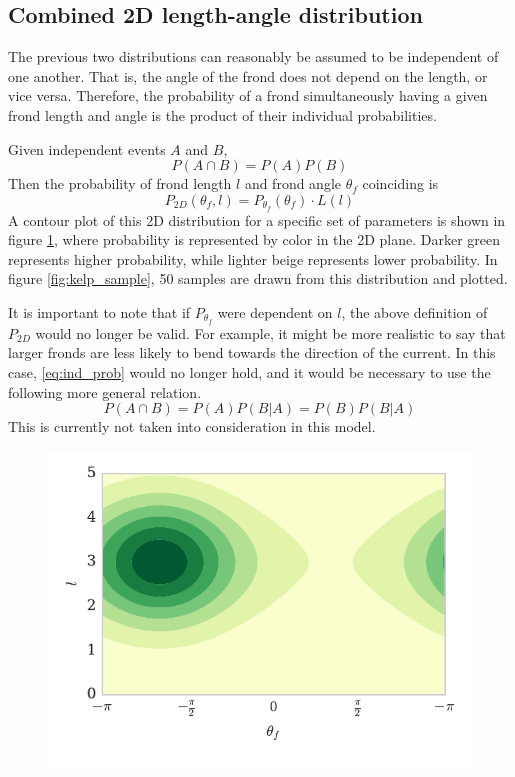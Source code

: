 \subsection{Combined 2D length-angle distribution}
\label{sec:2d_dist}
The previous two distributions can reasonably be assumed to be independent of one another. That is, the angle of the frond does not depend on the length, or vice versa.
Therefore, the probability of a frond simultaneously having a given frond length and angle is the product of their individual probabilities.

Given independent events $A$ and $B$,
\begin{equation}
	\label{eq:ind_prob}
	P(A \cap B) = P(A)P(B)
\end{equation}
Then the probability of frond length $l$ and frond angle $\theta_f$ coinciding is 
\begin{equation}
	P_{2D}(\theta_f,l) = P_{\theta_f}(\theta_f) \cdot L(l)
\end{equation}
A contour plot of this 2D distribution for a specific set of parameters is shown in figure \ref{fig:dist_2d}, where probability is represented by color in the 2D plane.
Darker green represents higher probability, while lighter beige represents lower probability.
In figure \ref{fig:kelp_sample}, 50 samples are drawn from this distribution and plotted.

It is important to note that if $P_{\theta_f}$ were dependent on $l$, the above definition of $P_{2D}$ would no longer be valid.
For example, it might be more realistic to say that larger fronds are less likely to bend towards the direction of the current.
In this case, \eqref{eq:ind_prob} would no longer hold, and it would be necessary to use the following more general relation.
\begin{equation}
	P(A \cap B) = P(A)P(B|A) = P(B)P(B|A)
\end{equation}
This is currently not taken into consideration in this model.

\begin{figure}[h]
	\centering
	\includegraphics[width=.75\linewidth]{prob_2d}
	\vspace{-3em}
	\label{fig:dist_2d}
\end{figure}

